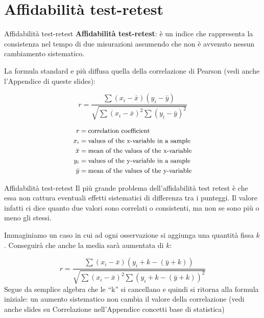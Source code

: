 \documentclass[
  ignorenonframetext,
]{beamer}
\begin{document}
\section{Affidabilità test-retest}\label{affidabilituxe0-test-retest}

\begin{frame}{Affidabilità test-retest}
\label{affidabilituxe0-test-retest-1}
\textbf{Affidabilità test-retest}: è un indice che rappresenta la
consistenza nel tempo di due misurazioni assumendo che non è avvenuto
nessun cambiamento sistematico.

La formula standard e più diffusa quella della correlazione di Pearson
(vedi anche l'Appendice di queste slides):

\[
r = \frac{\sum (x_i - \bar{x})(y_i - \bar{y})}
{\sqrt{\sum (x_i - \bar{x})^2 \sum (y_i - \bar{y})^2}}
\]

\[
\small
\begin{aligned}
r & = \text{correlation coefficient} \\
x_i & = \text{values of the x-variable in a sample} \\
\bar{x} & = \text{mean of the values of the x-variable} \\
y_i & = \text{values of the y-variable in a sample} \\
\bar{y} & = \text{mean of the values of the y-variable}
\end{aligned}
\]
\end{frame}

\begin{frame}{Affidabilità test-retest}
\label{affidabilituxe0-test-retest-2}
Il più grande problema dell'affidabilità test retest è che essa non
cattura eventuali effetti sistematici di differenza tra i punteggi. Il
valore infatti ci dice quanto due valori sono correlati o consistenti,
ma non se sono più o meno gli stessi.

Immaginiamo un caso in cui ad ogni osservazione si aggiunga una quantità
fissa \(k\). Conseguirà che anche la media sarà aumentata di \(k\):

\[
r = \frac{\sum (x_i - \bar{x})(y_i + k - (\bar{y} + k))}
{\sqrt{\sum (x_i - \bar{x})^2 \sum (y_i + k - (\bar{y} + k))^2}}
\] Segue da semplice algebra che le ``k'' si cancellano e quindi si
ritorna alla formula iniziale: un aumento sistematico non cambia il
valore della correlazione (vedi anche slides su Correlazione
nell'Appendice concetti base di statistica)
\end{frame}
\end{document}
